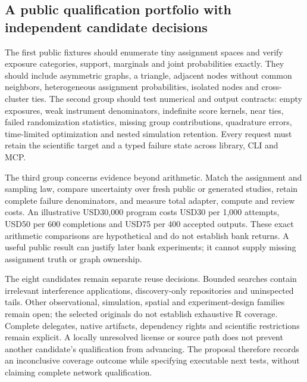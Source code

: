 \subsection{A public qualification portfolio with independent candidate decisions}

The first public fixtures should enumerate tiny assignment spaces and verify exposure categories, support, marginals and joint probabilities exactly. They should include asymmetric graphs, a triangle, adjacent nodes without common neighbors, heterogeneous assignment probabilities, isolated nodes and cross-cluster ties. The second group should test numerical and output contracts: empty exposures, weak instrument denominators, indefinite score kernels, near ties, failed randomization statistics, missing group contributions, quadrature errors, time-limited optimization and nested simulation retention. Every request must retain the scientific target and a typed failure state across library, CLI and MCP.~\citep{exec25_rnet_choice}

The third group concerns evidence beyond arithmetic. Match the assignment and sampling law, compare uncertainty over fresh public or generated studies, retain complete failure denominators, and measure total adapter, compute and review costs. An illustrative USD30,000 program costs USD30 per 1,000 attempts, USD50 per 600 completions and USD75 per 400 accepted outputs. These exact arithmetic comparisons are hypothetical and do not establish bank returns. A useful public result can justify later bank experiments; it cannot supply missing assignment truth or graph ownership.~\citep{exec25_rnet_choice}

The eight candidates remain separate reuse decisions. Bounded searches contain irrelevant interference applications, discovery-only repositories and uninspected tails. Other observational, simulation, spatial and experiment-design families remain open; the selected originals do not establish exhaustive R coverage. Complete delegates, native artifacts, dependency rights and scientific restrictions remain explicit. A locally unresolved license or source path does not prevent another candidate's qualification from advancing. The proposal therefore records an inconclusive coverage outcome while specifying executable next tests, without claiming complete network qualification.~\citep{exec25_rnet_choice}
